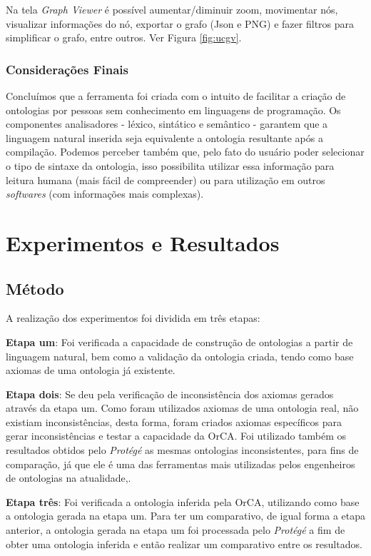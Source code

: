 \documentclass{bcc}
\begin{document}
Na tela \textit{Graph Viewer} é possível aumentar/diminuir zoom, movimentar nós, visualizar informações do nó, exportar o grafo (Json e PNG) e fazer filtros para simplificar o grafo, entre outros. Ver Figura \ref{fig:ucgv}.


\subsection{Considerações Finais}
Concluímos que a ferramenta foi criada com o intuito de facilitar a criação de ontologias por pessoas sem conhecimento em linguagens de programação. Os componentes analisadores - léxico, sintático e semântico - garantem que a linguagem natural inserida seja equivalente a ontologia resultante após a compilação. Podemos perceber também que, pelo fato do usuário poder selecionar o tipo de sintaxe da ontologia, isso possibilita utilizar essa informação para leitura humana (mais fácil de compreender) ou para utilização em outros \textit{softwares} (com informações mais complexas).


\chapter{Experimentos e Resultados}
\label{chap:exp}
\section{Método}
A realização dos experimentos foi dividida em três etapas: 

\textbf{Etapa um}:
Foi verificada a capacidade de construção de ontologias a partir de linguagem natural, bem como a validação da ontologia criada, tendo como base axiomas de uma ontologia já existente. 

\textbf{Etapa dois}:
Se deu pela verificação de inconsistência dos axiomas gerados através da etapa um. Como foram utilizados axiomas de uma ontologia real, não existiam inconsistências, desta forma, foram criados axiomas específicos para gerar inconsistências e testar a capacidade da OrCA. Foi utilizado também os resultados obtidos pelo \textit{Protégé} as mesmas ontologias inconsistentes, para fins de comparação, já que ele é uma das ferramentas mais utilizadas pelos engenheiros de ontologias na atualidade,.

\textbf{Etapa três}:
Foi verificada a ontologia inferida pela OrCA, utilizando como base a ontologia gerada na etapa um. Para ter um comparativo, de igual forma a etapa anterior, a ontologia gerada na etapa um foi processada pelo \textit{Protégé} a fim de obter uma ontologia inferida e então realizar um comparativo entre os resultados.
\end{document}
